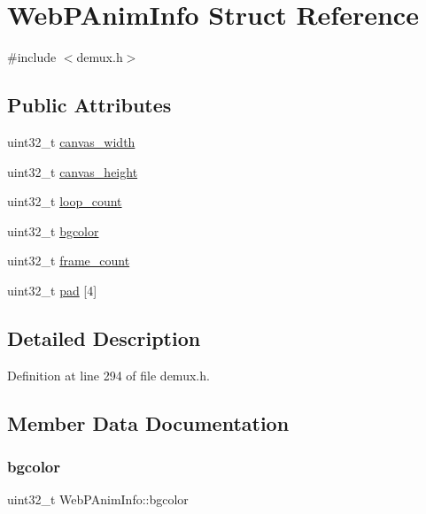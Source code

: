 \hypertarget{struct_web_p_anim_info}{}\section{Web\+P\+Anim\+Info Struct Reference}
\label{struct_web_p_anim_info}


{\ttfamily \#include $<$demux.\+h$>$}

\subsection*{Public Attributes}
\begin{DoxyCompactItemize}
\item 
uint32\+\_\+t \mbox{\hyperlink{struct_web_p_anim_info_a1efc4225c58ea950299ec8869797b7ac}{canvas\+\_\+width}}
\item 
uint32\+\_\+t \mbox{\hyperlink{struct_web_p_anim_info_a866192904b0bd83ea9b55bc79206a52d}{canvas\+\_\+height}}
\item 
uint32\+\_\+t \mbox{\hyperlink{struct_web_p_anim_info_ab2b49d1caeac83945d476d59312b8b9f}{loop\+\_\+count}}
\item 
uint32\+\_\+t \mbox{\hyperlink{struct_web_p_anim_info_a2eb71b4558d333b8f8b2bbe639501733}{bgcolor}}
\item 
uint32\+\_\+t \mbox{\hyperlink{struct_web_p_anim_info_a32b6cf64aab0e3844a6913764b04ccd1}{frame\+\_\+count}}
\item 
uint32\+\_\+t \mbox{\hyperlink{struct_web_p_anim_info_a3d98756b9a488001d7a9b99cfd6f0f1e}{pad}} \mbox{[}4\mbox{]}
\end{DoxyCompactItemize}


\subsection{Detailed Description}


Definition at line 294 of file demux.\+h.



\subsection{Member Data Documentation}
\mbox{\label{struct_web_p_anim_info_a2eb71b4558d333b8f8b2bbe639501733}} 
\subsubsection{\texorpdfstring{bgcolor}{bgcolor}}
{\footnotesize\ttfamily uint32\+\_\+t Web\+P\+Anim\+Info\+::bgcolor}



